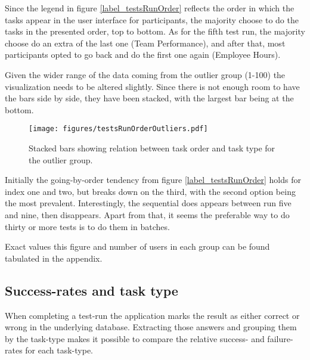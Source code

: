     Since the legend in figure \ref{label_testsRunOrder} reflects the order
    in which the tasks appear in the user interface for participants, the
    majority choose to do the tasks in the presented order, top to bottom.
    As for the fifth test run, the majority choose do an extra of the last
    one (Team Performance), and after that, most participants opted to go
    back and do the first one again (Employee Hours).

    Given the wider range of the data coming from the outlier group (1-100)
    the visualization needs to be altered slightly. Since there is not
    enough room to have the bars side by side, they have been stacked, with
    the largest bar being at the bottom.
    \begin{figure}[ht!]
      \centering
      \texttt{[image: figures/testsRunOrderOutliers.pdf]}
      \caption{
        Stacked bars showing relation between task order and task type for
        the outlier group.
      }
    \end{figure}

    Initially the going-by-order tendency from figure
    \ref{label_testsRunOrder} holds for index one and two, but breaks down
    on the third, with the second option being the most prevalent.
    Interestingly, the sequential does appears between run five and nine,
    then disappears. Apart from that, it seems the preferable way to do
    thirty or more tests is to do them in batches.

    Exact values this figure and number of users in each group can be found
    tabulated in the appendix. 

%

  \subsection{Success-rates and task type}

    When completing a test-run the application marks the result as
    either correct or wrong in the underlying database. Extracting
    those answers and grouping them by the task-type makes it possible to
    compare the relative success- and failure-rates for each task-type.

